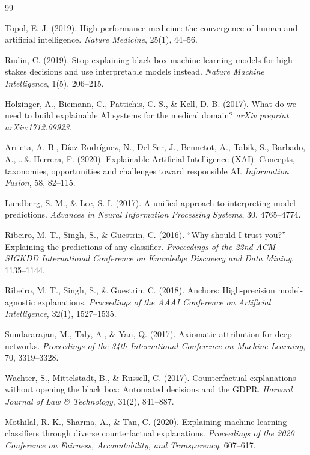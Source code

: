 \documentclass[journal]{IEEEtran}
\begin{document}

\begin{thebibliography}{99}

Topol, E. J. (2019). High-performance medicine: the convergence of human and artificial intelligence. \textit{Nature Medicine}, 25(1), 44--56.

Rudin, C. (2019). Stop explaining black box machine learning models for high stakes decisions and use interpretable models instead. \textit{Nature Machine Intelligence}, 1(5), 206--215.

Holzinger, A., Biemann, C., Pattichis, C. S., \& Kell, D. B. (2017). What do we need to build explainable AI systems for the medical domain? \textit{arXiv preprint arXiv:1712.09923}.

Arrieta, A. B., Díaz-Rodríguez, N., Del Ser, J., Bennetot, A., Tabik, S., Barbado, A., \ldots \& Herrera, F. (2020). Explainable Artificial Intelligence (XAI): Concepts, taxonomies, opportunities and challenges toward responsible AI. \textit{Information Fusion}, 58, 82--115.

Lundberg, S. M., \& Lee, S. I. (2017). A unified approach to interpreting model predictions. \textit{Advances in Neural Information Processing Systems}, 30, 4765--4774.

Ribeiro, M. T., Singh, S., \& Guestrin, C. (2016). ``Why should I trust you?'' Explaining the predictions of any classifier. \textit{Proceedings of the 22nd ACM SIGKDD International Conference on Knowledge Discovery and Data Mining}, 1135--1144.

Ribeiro, M. T., Singh, S., \& Guestrin, C. (2018). Anchors: High-precision model-agnostic explanations. \textit{Proceedings of the AAAI Conference on Artificial Intelligence}, 32(1), 1527--1535.

Sundararajan, M., Taly, A., \& Yan, Q. (2017). Axiomatic attribution for deep networks. \textit{Proceedings of the 34th International Conference on Machine Learning}, 70, 3319--3328.

Wachter, S., Mittelstadt, B., \& Russell, C. (2017). Counterfactual explanations without opening the black box: Automated decisions and the GDPR. \textit{Harvard Journal of Law \& Technology}, 31(2), 841--887.

Mothilal, R. K., Sharma, A., \& Tan, C. (2020). Explaining machine learning classifiers through diverse counterfactual explanations. \textit{Proceedings of the 2020 Conference on Fairness, Accountability, and Transparency}, 607--617.


\end{thebibliography}
\end{document}
